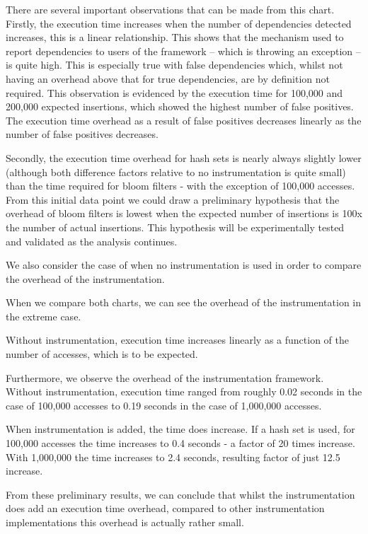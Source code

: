 	There are several important observations that can be made from this chart. Firstly, the execution time increases when the number of dependencies detected increases, this is a linear relationship. This shows that the mechanism used to report dependencies to users of the framework -- which is throwing an exception -- is quite high. This is especially true with false dependencies which, whilst not having an overhead above that for true dependencies, are by definition not required. This observation is evidenced by the execution time for 100,000 and 200,000 expected insertions, which showed the highest number of false positives. The execution time overhead as a result of false positives decreases linearly as the number of false positives decreases.
	
	Secondly, the execution time overhead for hash sets is nearly always slightly lower (although both difference factors relative to no instrumentation is quite small) than the time required for bloom filters - with the exception of 100,000 accesses. From this initial data point we could draw a preliminary hypothesis that the overhead of bloom filters is lowest when the expected number of insertions is 100x the number of actual insertions. This hypothesis will be experimentally tested and validated as the analysis continues.
	
	We also consider the case of when no instrumentation is used in order to compare the overhead of the instrumentation.
	
	When we compare both charts, we can see the overhead of the instrumentation in the extreme case.
	
	Without instrumentation, execution time increases linearly as a function of the number of accesses, which is to be expected.
	
	Furthermore, we observe the overhead of the instrumentation framework. Without instrumentation, execution time ranged from roughly 0.02 seconds in the case of 100,000 accesses to 0.19 seconds in the case of 1,000,000 accesses.
	
	When instrumentation is added, the time does increase. If a hash set is used, for 100,000 accesses the time increases to 0.4 seconds - a factor of 20 times increase. With 1,000,000 the time increases to 2.4 seconds, resulting factor of just 12.5 increase.
	
	From these preliminary results, we can conclude that whilst the instrumentation does add an execution time overhead, compared to other instrumentation implementations this overhead is actually rather small.
	
